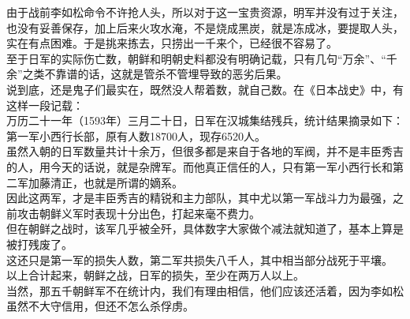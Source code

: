 \begin{multicols}{\theparacolNo}
由于战前李如松命令不许抢人头，所以对于这一宝贵资源，明军并没有过于关注，也没有妥善保存，加上后来火攻水淹，不是烧成黑炭，就是冻成冰，要提取人头，实在有点困难。于是挑来拣去，只捞出一千来个，已经很不容易了。\\

至于日军的实际伤亡数，朝鲜和明朝史料都没有明确记载，只有几句“万余”、“千余”之类不靠谱的话，这就是管杀不管埋导致的恶劣后果。\\

说到底，还是鬼子们最实在，既然没人帮着数，就自己数。在《日本战史》中，有这样一段记载：\\

万历二十一年（1593年）三月二十日，日军在汉城集结残兵，统计结果摘录如下：第一军小西行长部，原有人数18700人，现存6520人。\\

虽然入朝的日军数量共计十余万，但很多都是来自于各地的军阀，并不是丰臣秀吉的人，用今天的话说，就是杂牌军。而他真正信任的人，只有第一军小西行长和第二军加藤清正，也就是所谓的嫡系。\\

因此这两军，才是丰臣秀吉的精锐和主力部队，其中尤以第一军战斗力为最强，之前攻击朝鲜义军时表现十分出色，打起来毫不费力。\\

但在朝鲜之战时，该军几乎被全歼，具体数字大家做个减法就知道了，基本上算是被打残废了。\\

这还只是第一军的损失人数，第二军共损失八千人，其中相当部分战死于平壤。\\

以上合计起来，朝鲜之战，日军的损失，至少在两万人以上。\\

当然，那五千朝鲜军不在统计内，我们有理由相信，他们应该还活着，因为李如松虽然不大守信用，但还不怎么杀俘虏。\\

\ifnum{}
	\end{multicols}
\fi
\newpage

